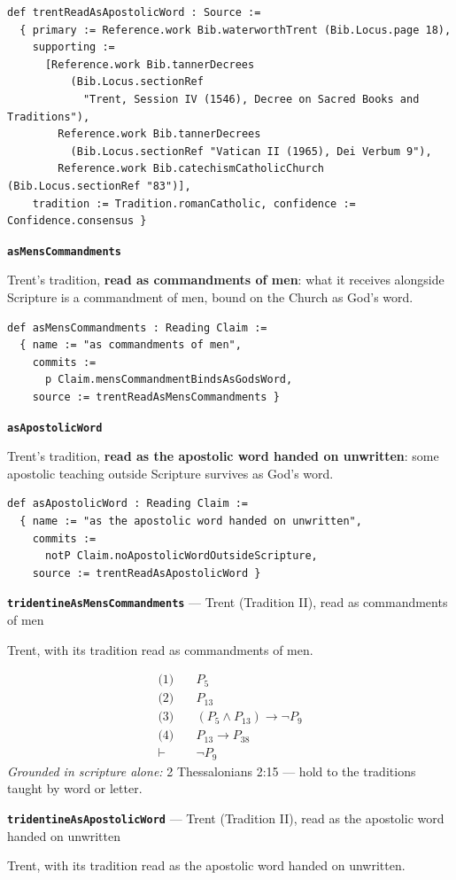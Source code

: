 \documentclass[11pt]{article}
\begin{document}
{\small\begin{verbatim}
def trentReadAsApostolicWord : Source :=
  { primary := Reference.work Bib.waterworthTrent (Bib.Locus.page 18),
    supporting :=
      [Reference.work Bib.tannerDecrees
          (Bib.Locus.sectionRef
            "Trent, Session IV (1546), Decree on Sacred Books and Traditions"),
        Reference.work Bib.tannerDecrees
          (Bib.Locus.sectionRef "Vatican II (1965), Dei Verbum 9"),
        Reference.work Bib.catechismCatholicChurch (Bib.Locus.sectionRef "83")],
    tradition := Tradition.romanCatholic, confidence := Confidence.consensus }
\end{verbatim}}
\par\medskip\noindent\textbf{\texttt{as\allowbreak{}Mens\allowbreak{}Commandments}}\par\nobreak\noindent
Trent's tradition, \textbf{read as commandments of men}: what it receives alongside Scripture is a commandment of men, bound on the Church as God's word.

{\small\begin{verbatim}
def asMensCommandments : Reading Claim :=
  { name := "as commandments of men",
    commits :=
      p Claim.mensCommandmentBindsAsGodsWord,
    source := trentReadAsMensCommandments }
\end{verbatim}}
\par\medskip\noindent\textbf{\texttt{as\allowbreak{}Apostolic\allowbreak{}Word}}\par\nobreak\noindent
Trent's tradition, \textbf{read as the apostolic word handed on unwritten}: some apostolic teaching outside Scripture survives as God's word.

{\small\begin{verbatim}
def asApostolicWord : Reading Claim :=
  { name := "as the apostolic word handed on unwritten",
    commits :=
      notP Claim.noApostolicWordOutsideScripture,
    source := trentReadAsApostolicWord }
\end{verbatim}}
\par\medskip\noindent\textbf{\texttt{tridentine\allowbreak{}As\allowbreak{}Mens\allowbreak{}Commandments}} --- Trent (Tradition II), read as commandments of men\par\nobreak\noindent
Trent, with its tradition read as commandments of men.

\begin{align*}
  \text{(1)} \quad & P_{5} \\
  \text{(2)} \quad & P_{13} \\
  \text{(3)} \quad & (P_{5} \land P_{13}) \rightarrow \lnot P_{9} \\
  \text{(4)} \quad & P_{13} \rightarrow P_{38} \\
  \vdash \quad & \lnot P_{9}
\end{align*}
\emph{Grounded in scripture alone:} 2 Thessalonians 2:15 — hold to the traditions taught by word or letter.
\par\medskip\noindent\textbf{\texttt{tridentine\allowbreak{}As\allowbreak{}Apostolic\allowbreak{}Word}} --- Trent (Tradition II), read as the apostolic word handed on unwritten\par\nobreak\noindent
Trent, with its tradition read as the apostolic word handed on unwritten.
\end{document}
